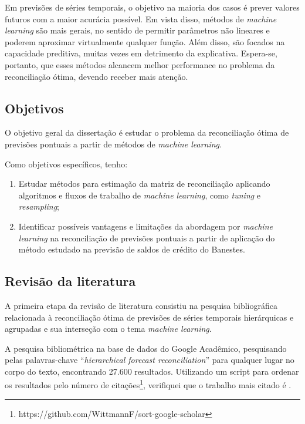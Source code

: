 \documentclass[
  12pt,
  oneside,
  a4paper,
  chapter=TITLE,
  section=TITLE,
  brazil]{abntex2}
\providecommand{\tightlist}{%
  \setlength{\itemsep}{0pt}\setlength{\parskip}{0pt}}\usepackage{longtable,booktabs,array}
\begin{document}
Em previsões de séries temporais, o objetivo na maioria dos casos é
prever valores futuros com a maior acurácia possível. Em vista disso,
métodos de \emph{machine learning} são mais gerais, no sentido de
permitir parâmetros não lineares e poderem aproximar virtualmente
qualquer função. Além disso, são focados na capacidade preditiva, muitas
vezes em detrimento da explicativa. Espera-se, portanto, que esses
métodos alcancem melhor performance no problema da reconciliação ótima,
devendo receber mais atenção.

\hypertarget{objetivos}{%
\subsection{Objetivos}\label{objetivos}}

O objetivo geral da dissertação é estudar o problema da reconciliação
ótima de previsões pontuais a partir de métodos de \emph{machine
learning}.

Como objetivos específicos, tenho:

\begin{enumerate}
\def\labelenumi{\arabic{enumi}.}
\tightlist
\item
  Estudar métodos para estimação da matriz de reconciliação aplicando
  algoritmos e fluxos de trabalho de \emph{machine learning}, como
  \emph{tuning} e \emph{resampling};
\item
  Identificar possíveis vantagens e limitações da abordagem por
  \emph{machine learning} na reconciliação de previsões pontuais a
  partir de aplicação do método estudado na previsão de saldos de
  crédito do Banestes.
\end{enumerate}

\hypertarget{revisuxe3o-da-literatura}{%
\subsection{Revisão da literatura}\label{revisuxe3o-da-literatura}}

A primeira etapa da revisão de literatura consistiu na pesquisa
bibliográfica relacionada à reconciliação ótima de previsões de séries
temporais hierárquicas e agrupadas e sua interseção com o tema
\emph{machine learning}.

A pesquisa bibliométrica na base de dados do Google Acadêmico,
pesquisando pelas palavras-chave ``\emph{hierarchical forecast
reconciliation}'' para qualquer lugar no corpo do texto, encontrando
27.600 resultados. Utilizando um script para ordenar os resultados pelo
número de citações\footnote{https://github.com/WittmannF/sort-google-scholar},
verifiquei que o trabalho mais citado é
\textcite{hyndman_forecasting_2021}.
\end{document}
